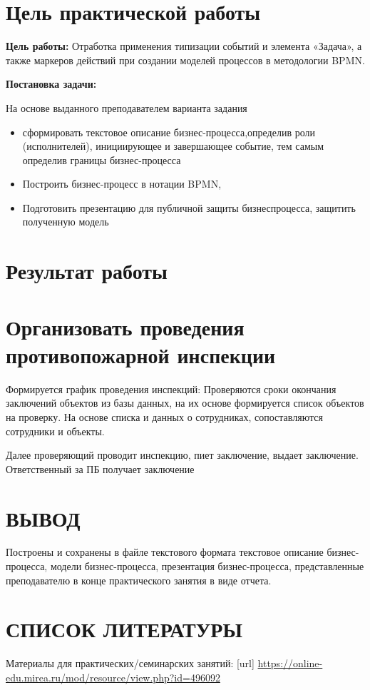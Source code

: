 
\section*{\LARGE Цель практической работы}

\textbf{Цель работы:} Отработка применения типизации событий и элемента
«Задача», а также маркеров действий при создании моделей процессов в
методологии BPMN.



\textbf{Постановка задачи:}\par
На основе выданного преподавателем варианта задания
\begin{itemize}
    \item сформировать текстовое описание бизнес-процесса,определив роли (исполнителей), инициирующее и завершающее событие, тем самым определив границы    бизнес-процесса
    \item Построить бизнес-процесс в нотации BPMN,
    \item Подготовить презентацию для публичной защиты бизнеспроцесса, защитить полученную модель
\end{itemize}


\newpage

\section*{\LARGE Результат работы}

\section{Организовать проведения противопожарной инспекции}

Формируется график проведения инспекций:
Проверяются сроки окончания заключений объектов из базы данных, на их основе формируется список объектов на проверку.
На основе списка и данных о сотрудниках, сопоставляются сотрудники и объекты.

Далее проверяющий проводит инспекцию, пиет заключение, выдает заключение.
Ответственный за ПБ получает заключение


\clearpage

\newpage

\section*{ВЫВОД}
Построены и сохранены в
файле текстового формата текстовое описание бизнес-процесса, модели
бизнес-процесса, презентация бизнес-процесса, представленные
преподавателю в конце практического занятия в виде отчета.
\newpage

\section*{СПИСОК ЛИТЕРАТУРЫ}
\begin{thebibliography}{}
    \bibitem{}  Материалы для практических/семинарских занятий: [url]
    \url{https://online-edu.mirea.ru/mod/resource/view.php?id=496092}
\end{thebibliography}
